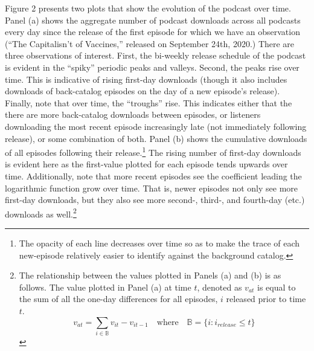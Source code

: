 \documentclass[11pt, letterpaper, twoside]{article}
\begin{document}
Figure 2 presents two plots that show the evolution of the podcast over time. Panel (a) shows the aggregate number of podcast downloads across all podcasts every day since the release of the first episode for which we have an observation (``The Capitalisn't of Vaccines,'' released on September 24th, 2020.) There are three observations of interest. First, the bi-weekly release schedule of the podcast is evident in the ``spiky'' periodic peaks and valleys. Second, the peaks rise over time. This is indicative of rising first-day downloads (though it also includes downloads of back-catalog episodes on the day of a new episode's release). Finally, note that over time, the ``troughs'' rise. This indicates either that the there are more back-catalog downloads between episodes, or listeners downloading the most recent episode increasingly late (not immediately following release), or some combination of both. Panel (b) shows the cumulative downloads of all episodes following their release.\footnote{The opacity of each line decreases over time so as to make the trace of each new-episode relatively easier to identify against the background catalog.} The rising number of first-day downloads is evident here as the first-value plotted for each episode tends upwards over time. Additionally, note that more recent episodes see the coefficient leading the logarithmic function grow over time. That is, newer episodes not only see more first-day downloads, but they also see more second-, third-, and fourth-day (etc.) downloads as well.\footnote{The relationship between the values plotted in Panels (a) and (b) is as follows. The value plotted in Panel (a) at time $t$, denoted as $v_{at}$ is equal to the sum of all the one-day differences for all episodes, $i$ released prior to time $t$. $$v_{at} = \sum_{i \in \mathbb{B}} v_{it} - v_{it-1} \quad \text{where} \quad \mathbb{B}= \{i: i_{release} \leq t\}$$}\\
\end{document}
